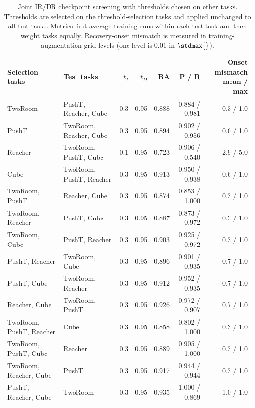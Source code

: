 \begin{table}[t]
\centering
\caption{Joint IR/DR checkpoint screening with thresholds chosen on other tasks. Thresholds are selected on the threshold-selection tasks and applied unchanged to all test tasks. Metrics first average training runs within each test task and then weight tasks equally. Recovery-onset mismatch is measured in training-augmentation grid levels (one level is $0.01$ in $\stdmax{}$).}
\label{tab:cross-task-all-subsets}
\small
\setlength{\tabcolsep}{3.5pt}
\begin{tabular}{>{\raggedright\arraybackslash}p{}>{\raggedright\arraybackslash}p{}rrrrr}
\toprule
Selection tasks & Test tasks & $t_I$ & $t_D$ & BA & P / R & \shortstack{Onset mismatch\\mean / max} \\
\midrule
TwoRoom & PushT, Reacher, Cube & 0.3 & 0.95 & 0.888 & 0.884 / 0.981 & 0.3 / 1.0 \\
PushT & TwoRoom, Reacher, Cube & 0.3 & 0.95 & 0.894 & 0.902 / 0.956 & 0.6 / 1.0 \\
Reacher & TwoRoom, PushT, Cube & 0.1 & 0.95 & 0.723 & 0.906 / 0.540 & 2.9 / 5.0 \\
Cube & TwoRoom, PushT, Reacher & 0.3 & 0.95 & 0.913 & 0.950 / 0.938 & 0.6 / 1.0 \\
TwoRoom, PushT & Reacher, Cube & 0.3 & 0.95 & 0.874 & 0.853 / 1.000 & 0.3 / 1.0 \\
TwoRoom, Reacher & PushT, Cube & 0.3 & 0.95 & 0.887 & 0.873 / 0.972 & 0.3 / 1.0 \\
TwoRoom, Cube & PushT, Reacher & 0.3 & 0.95 & 0.903 & 0.925 / 0.972 & 0.3 / 1.0 \\
PushT, Reacher & TwoRoom, Cube & 0.3 & 0.95 & 0.896 & 0.901 / 0.935 & 0.7 / 1.0 \\
PushT, Cube & TwoRoom, Reacher & 0.3 & 0.95 & 0.912 & 0.952 / 0.935 & 0.7 / 1.0 \\
Reacher, Cube & TwoRoom, PushT & 0.3 & 0.95 & 0.926 & 0.972 / 0.907 & 0.7 / 1.0 \\
TwoRoom, PushT, Reacher & Cube & 0.3 & 0.95 & 0.858 & 0.802 / 1.000 & 0.3 / 1.0 \\
TwoRoom, PushT, Cube & Reacher & 0.3 & 0.95 & 0.889 & 0.905 / 1.000 & 0.3 / 1.0 \\
TwoRoom, Reacher, Cube & PushT & 0.3 & 0.95 & 0.917 & 0.944 / 0.944 & 0.3 / 1.0 \\
PushT, Reacher, Cube & TwoRoom & 0.3 & 0.95 & 0.935 & 1.000 / 0.869 & 1.0 / 1.0 \\
\bottomrule
\end{tabular}
\end{table}
